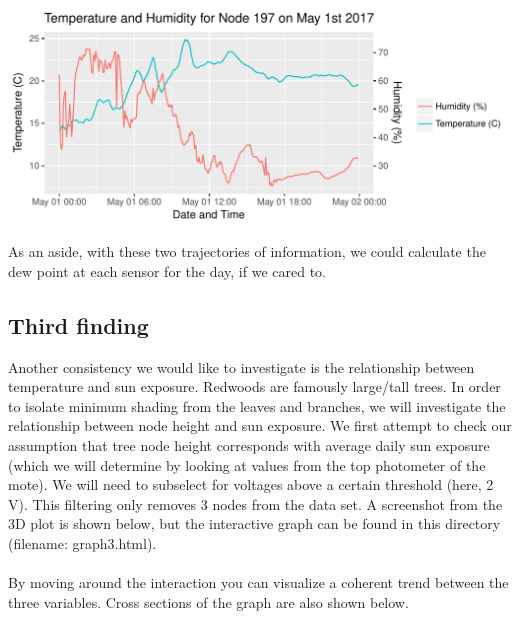 \documentclass[english]{article}\usepackage[]{graphicx}\usepackage[]{color}
\makeatletter
\def\maxwidth{ %
  \ifdim\Gin@nat@width>\linewidth
    \linewidth
  \else
    \Gin@nat@width
  \fi
}
\newenvironment{knitrout}{}{} %
\makeatother
\begin{document}
\begin{knitrout}
\color{fgcolor}

{\centering \includegraphics[width=\maxwidth]{figure/q2_2-1} 

}



\end{knitrout}

As an aside, with these two trajectories of information, we could calculate the dew point at
each sensor for the day, if we cared to.

\subsection{Third finding}

Another consistency we would like to investigate is the relationship between temperature and sun exposure.
Redwoods are famously large/tall trees.  In order to isolate minimum shading from the leaves and branches, 
we will investigate the relationship between node height and sun exposure.  We first attempt to check our
assumption that tree node height corresponds with average daily sun exposure (which we will determine by
looking at values from the top photometer of the mote).  We will need to subselect for voltages above a 
certain threshold (here, 2 V).  This filtering only removes 3 nodes from the data set.  A screenshot from the
3D plot is shown below, but the interactive graph can be found in this directory (filename: graph3.html).\\\\
By moving around the interaction you can visualize a coherent trend between the three variables.
Cross sections of the graph are also shown below.
\end{document}
